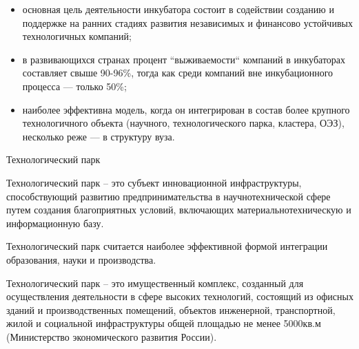 \documentclass[_Venture_p3.tex]{subfiles}
\begin{document}
\begin{frame}[allowframebreaks]{}{}
\begin{itemize}
	\item основная цель деятельности инкубатора состоит в содействии созданию и поддержке на ранних стадиях развития независимых и финансово устойчивых технологичных компаний;
	\item в развивающихся странах процент ``выживаемости`` компаний в инкубаторах составляет свыше 90-96\%, тогда как среди компаний вне инкубационного процесса — только 50\%;
	
	\pagebreak
	\item наиболее эффективна модель, когда он интегрирован в состав более крупного технологичного объекта (научного, технологического парка, кластера, ОЭЗ), несколько реже — в структуру вуза.
\end{itemize}
\end{frame}






\begin{frame}[allowframebreaks]{Технологический парк}{}
\begin{block}{Технологический парк}
	\quad
	– это субъект инновационной инфраструктуры, способствующий развитию предпринимательства в научнотехнической сфере путем создания благоприятных условий, включающих материальнотехническую и информационную базу.
\end{block}

Технологический парк считается наиболее эффективной формой интеграции образования, науки и производства.

\pagebreak


\begin{block}{Технологический парк}
	\quad
	– это имущественный комплекс, созданный для осуществления деятельности в сфере высоких технологий, состоящий из офисных зданий и производственных помещений, объектов инженерной, транспортной, жилой и социальной инфраструктуры общей площадью не менее 5000кв.м (Министерство экономического развития России).
\end{block}
\end{frame}
\end{document}

